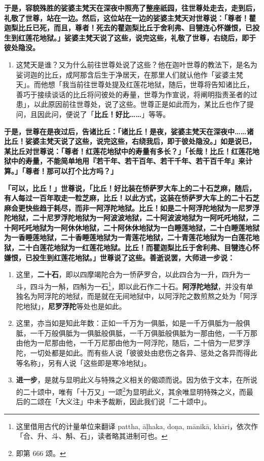 \textbf{于是，容貌殊胜的娑婆主梵天在深夜中照亮了整座祇园，往世尊处走去，走到后，礼敬了世尊，站在一边。然后，这位站在一边的娑婆主梵天对世尊说：「尊者！瞿迦梨比丘已死，而且，尊者！死去的瞿迦梨比丘于舍利弗、目犍连心怀嫌恨，已投生到红莲花地狱。」娑婆主梵天说了这些，说完这些，礼敬了世尊，右绕后，即于彼处隐没。}

\begin{enumerate}\item 这梵天是谁？又为什么前往世尊处说了这些？他在迦叶世尊的教法下，是名为 娑诃迦的比丘，成阿那含后生于净居天，在那里人们就认他作「娑婆主梵天」。而他想「我当前往世尊处提及红莲花地狱，随后，世尊将告知诸比丘，善巧于接续谈话的比丘将问彼处的寿量，世尊为作宣说，将阐明指责圣者的过患」，以此原因前往世尊处，说了这些。世尊正是如此而为，某比丘也作了提问，且因此问，便说了「\textbf{比丘！好比……}」等等。\end{enumerate}

\textbf{于是，世尊在是夜过后，告诸比丘：「诸比丘！是夜，娑婆主梵天在深夜中……诸比丘！娑婆主梵天说了这些，说完这些，右绕我后，即于彼处隐没。」如是说已，某比丘对世尊说：「尊者！红莲花地狱中的寿量有多长？」「长哉！比丘！红莲花地狱中的寿量，不能简单地用『若干年、若干百年、若干千年、若干百千年』来计算。」「尊者！那可以打个比方吗？」}

\textbf{「可以，比丘！」世尊说，「比丘！好比装在㤭萨罗大车上的二十石芝麻，随后，有人每过一百年取走一粒芝麻，比丘！以此方式，这装在㤭萨罗大车上的二十石芝麻会更快些趋于耗尽，而非一阿浮陀地狱。比丘！如是二十阿浮陀地狱为一尼罗浮陀地狱，二十尼罗浮陀地狱为一阿波波地狱，二十阿波波地狱为一阿吒吒地狱，二十阿吒吒地狱为一阿休休地狱，二十阿休休地狱为一白睡莲地狱，二十白睡莲地狱为一香睡莲地狱，二十香睡莲地狱为一青莲花地狱，二十青莲花地狱为一白莲花地狱，二十白莲花地狱为一红莲花地狱。比丘！而瞿迦梨比丘于舍利弗、目犍连心怀嫌恨，已投生到红莲花地狱。」世尊说了这些。善逝说罢，大师进一步说：}

\begin{enumerate}\item 这里，\textbf{二十石}，即以四摩竭陀合为一㤭萨罗合，以此四合为一升，四升为一斗，四斗为一斛，四斛为一石\footnote{这里借用古代的计量单位来翻译 pattha, āḷhaka, doṇa, mānikā, khāri，依次作「合、升、斗、斛、石」，读者略其进制可也。}，即以此石作二十石。\textbf{阿浮陀地狱}，并没有单独名为阿浮陀的地狱，而是就在无间地狱中，以阿浮陀之数煎熬之处为「阿浮陀地狱」，\textbf{尼罗浮陀}等处也是如此。
\item 这里，亦当如是知此年数：正如一千万为一俱胝，如是一千万俱胝为一般俱胝，一千万般俱胝为一俱胝般俱胝，一千万俱胝般俱胝为一那由他，一千万那由他为一尼那由他，一千万尼那由他为一阿浮陀，随后，二十倍为一尼罗浮陀，一切处都是如此。而有些人说「彼彼处由悲伤之各异、惩处之各异而得此等名称」，另有人说「这些即是寒冷地狱」。
\item \textbf{进一步}，是就与显明此义与特殊之义相关的偈颂而说。因为依于文本，在所说的二十颂中，唯有「十万又」一颂\footnote{即第 666 颂。}为显明此义，其余唯显明特殊之义，而最后的二颂在「大义注」中未予裁断，因此我们说「二十颂中」。\end{enumerate}

